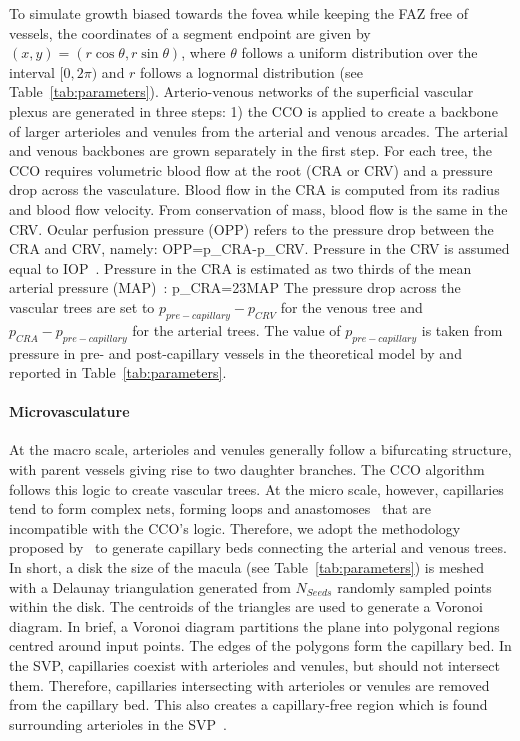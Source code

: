 \documentclass[11pt,]{article}
\let\oldequation\equation
\let\oldendequation\endequation
\renewenvironment{equation}
  {\linenomathNonumbers\oldequation}
  {\oldendequation\endlinenomath}
\begin{document}
To simulate growth biased towards the fovea while keeping the FAZ free
of vessels, the coordinates of a segment endpoint are given by
$(x,y)=(r\cos\theta, r\sin\theta)$, where $\theta$ follows a uniform
distribution over the interval $[0,2\pi)$ and $r$ follows a lognormal
distribution (see Table~\ref{tab:parameters}). Arterio-venous
networks of the superficial vascular plexus are generated in three
steps: 1) the CCO is applied to create a backbone of larger arterioles
and venules from the arterial and venous arcades. The arterial and
venous backbones are grown separately in the first step. For each
tree, the CCO requires volumetric blood flow at the root (CRA or CRV)
and a pressure drop across the vasculature. Blood flow in the CRA is
computed from its radius and blood flow velocity. From conservation of
mass, blood flow is the same in the CRV.
Ocular perfusion pressure (OPP) refers to the pressure drop between the CRA and CRV, namely:
\begin{equation}
OPP=p_{CRA}-p_{CRV}.\label{eq:OPP}
\end{equation}
Pressure in the CRV is assumed equal to IOP~\cite{Arciero2013,Guidoboni2014,Zheng2010}.
Pressure in the CRA is estimated as two thirds of the mean arterial pressure (MAP)~\cite{Arciero2013,Guidoboni2014,Zheng2010}:
\begin{equation}
p_{CRA}=\frac23MAP\label{eq:pCRA}
\end{equation}
The pressure drop across the vascular trees are set to
$p_{pre-capillary}-p_{CRV}$ for the venous tree and
$p_{CRA}-p_{pre-capillary}$ for the arterial trees. The value of
$p_{pre-capillary}$ is taken from pressure in pre- and post-capillary vessels in
the theoretical model by \citet{Takahashi2009} and reported in
Table~\ref{tab:parameters}.

\paragraph{Microvasculature}\label{sec:microvasculature} At the macro
scale, arterioles and venules generally follow a bifurcating
structure, with parent vessels giving rise to two daughter
branches. The CCO algorithm follows this logic to create vascular
trees.  At the micro scale, however, capillaries tend to form complex
nets, forming loops and anastomoses~\cite{An2020} that are
incompatible with the CCO’s logic.
Therefore, we adopt the methodology proposed by~\citet{Linninger2013} to generate capillary beds connecting
the arterial and venous trees.  In short, a disk the size of the
macula (see Table~\ref{tab:parameters}) is meshed with a Delaunay
triangulation generated from $N_{Seeds}$ randomly sampled points
within the disk.
The centroids of the triangles are used to generate a Voronoi diagram.
In brief, a Voronoi diagram partitions the plane into polygonal regions centred around input points. 
The edges of the polygons form the capillary bed.
In the SVP, capillaries coexist with arterioles and venules, but should not intersect them.
Therefore, capillaries intersecting with arterioles or venules are removed from the capillary bed.
This also creates a capillary-free region which is found surrounding arterioles in the SVP~\cite{An2020}.
\end{document}
